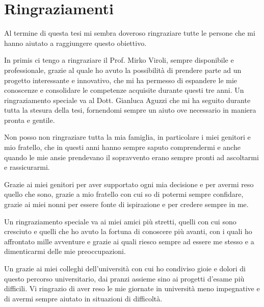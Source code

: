 \documentclass[12pt,a4paper,openright,twoside]{book}
\begin{document}
\backmatter
\printbibliography

\chapter*{Ringraziamenti}
Al termine di questa tesi mi sembra doveroso ringraziare tutte le persone che mi hanno aiutato a raggiungere questo obiettivo.

In primis ci tengo a ringraziare il Prof. Mirko Viroli, sempre disponibile e professionale, grazie al quale ho avuto la possibilità di prendere parte ad un progetto interessante e innovativo, che mi ha permesso di espandere le mie conoscenze e consolidare le competenze acquisite durante questi tre anni.
Un ringraziamento speciale va al Dott. Gianluca Aguzzi che mi ha seguito durante tutta la stesura della tesi, fornendomi sempre un aiuto ove necessario in maniera pronta e gentile.

Non posso non ringraziare tutta la mia famiglia, in particolare i miei genitori e mio fratello, che in questi anni hanno sempre saputo comprendermi e anche quando le mie ansie prendevano il sopravvento erano sempre pronti ad ascoltarmi e rassicurarmi. 

Grazie ai miei genitori per aver supportato ogni mia decisione e per avermi reso quello che sono, grazie a mio fratello con cui so di potermi sempre confidare, grazie ai miei nonni per essere fonte di ispirazione e per credere sempre in me. 

Un ringraziamento speciale va ai miei amici più stretti, quelli con cui sono cresciuto e quelli che ho avuto la fortuna di conoscere più avanti, con i quali ho affrontato mille avventure e grazie ai quali riesco sempre ad essere me stesso e a dimenticarmi delle mie preoccupazioni.

Un grazie ai miei colleghi dell'università con cui ho condiviso gioie e dolori di questo percorso universitario, dai pranzi assieme sino ai progetti d'esame più difficili. Vi ringrazio di aver reso le mie giornate in università meno impegnative e di avermi sempre aiutato in situazioni di difficoltà.
\end{document}
